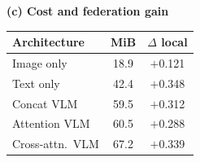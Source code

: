 \begin{table}[t]
\begin{minipage}[t]{0.30\textwidth}
\begin{tabular}{lcccc}
\bottomrule
\end{tabular}
\end{minipage}\hfill
\begin{minipage}[t]{0.29\textwidth}
\centering
\textbf{(c) Cost and federation gain}
\begin{tabular}{lcc}
\toprule
Architecture & MiB & $\Delta$ local\\
\midrule
Image only       & 18.9 & $+$0.121\\
Text only        & 42.4 & $+$0.348\\
Concat VLM       & 59.5 & $+$0.312\\
Attention VLM    & 60.5 & $+$0.288\\
Cross-attn.\ VLM & 67.2 & $+$0.339\\
\bottomrule
\end{tabular}
\end{minipage}
\end{table}
